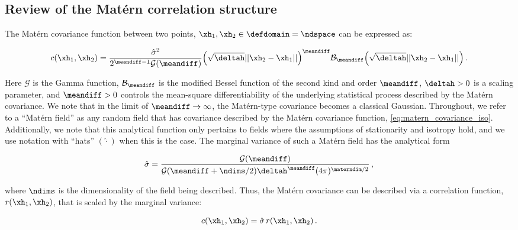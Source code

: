 \documentclass[alpha-refs]{wiley-article}
\begin{document}
\subsection{Review of the Mat\'ern correlation structure}
\label{ssec:matern_review}

The Mat\'ern covariance function between two points, $\xh_1,\xh_2\in\defdomain =
\ndspace$ can be expressed as:
\begin{linenomath*}\begin{equation}
    c(\xh_1,\xh_2) = \dfrac{\hat{\sigma}^2}{2^{\meandiff-1}
    \mathcal{G}(\meandiff)}
    \Big(\sqrt{\deltah} ||\xh_2-\xh_1||\Big)^\meandiff
    \mathcal{B}_\meandiff
    \Big(\sqrt{\deltah} ||\xh_2-\xh_1||\Big) \, .
    \label{eq:matern_covariance_iso}
\end{equation}\end{linenomath*}
Here
$\mathcal{G}$ is the Gamma function,
$\mathcal{B}_\meandiff$ is the modified
Bessel function of the second kind and order $\meandiff$,
$\deltah>0$ is a scaling parameter, and $\meandiff>0$
controls the mean-square differentiability of the underlying statistical process
described by the Mat\'ern covariance.
We note that in the limit of $\meandiff\rightarrow\infty$, the Mat\'ern-type
covariance becomes a classical Gaussian.
Throughout, we refer to a ``Mat\'ern field'' as any random field that has
covariance described by the Mat\'ern covariance function,
\cref{eq:matern_covariance_iso}.
Additionally, we note that this analytical function only pertains to fields where the
assumptions of stationarity and isotropy hold,
and we use notation with ``hats'' $(\hat{\cdot})$ when this is the case.
The marginal variance of such a Mat\'ern field has the analytical form
\begin{linenomath*}\begin{equation}
    \hat{\sigma} = \dfrac{\mathcal{G}(\meandiff)}{
        \mathcal{G}(\meandiff + \ndims/2)
        \deltah^{\meandiff}
        (4\pi)^{\materndim/2}
    } \, ,
    \label{eq:matern_variance}
\end{equation}\end{linenomath*}
where $\ndims$ is the dimensionality of the field being described.
Thus, the Mat\'ern covariance can be described via a correlation
function, $r(\xh_1, \xh_2)$, that is scaled by the marginal variance:
\begin{linenomath*}\begin{equation*}
    c(\xh_1, \xh_2) = \hat{\sigma}\,r(\xh_1, \xh_2) \, .
\end{equation*}\end{linenomath*}
\end{document}
